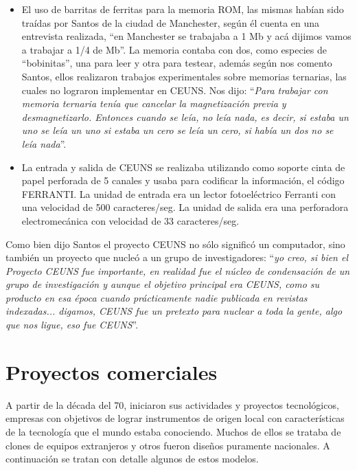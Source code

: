 \documentclass[%
 	final,
%
	notitlepage,
	narroweqnarray,
	inline,
 	twoside,
	]{ieee}
\begin{document}
\begin{itemize}
\item El uso de barritas de ferritas para la memoria ROM, las mismas hab\'ian sido tra\'idas por Santos de la ciudad de Manchester, seg\'un \'el cuenta en una entrevista realizada, ``en Manchester se trabajaba a 1 Mb y ac\'a dijimos vamos a trabajar a 1/4 de Mb''. La memoria contaba con dos, como especies de ``bobinitas'', una para leer y otra para testear, adem\'as seg\'un nos comento Santos, ellos realizaron trabajos experimentales sobre memorias ternarias, las cuales no lograron implementar en CEUNS. Nos dijo: ``\textit{Para trabajar con memoria ternaria ten\'ia que cancelar la magnetizaci\'on previa y desmagnetizarlo. Entonces cuando se le\'ia, no le\'ia nada, es decir, si estaba un uno se le\'ia un uno si estaba un cero se le\'ia un cero, si hab\'ia un dos no se le\'ia nada}''.
\item La entrada y salida de CEUNS se realizaba utilizando como soporte cinta de papel perforada de 5 canales y usaba para codificar la informaci\'on, el c\'odigo FERRANTI. La unidad de entrada era un lector fotoel\'ectrico Ferranti con una velocidad de 500 caracteres/seg. La unidad de salida era una perforadora electromec\'anica con velocidad de 33 caracteres/seg.
\end{itemize}

Como bien dijo Santos el proyecto CEUNS no s\'olo signific\'o un computador, sino tambi\'en un proyecto que nucle\'o a un grupo de investigadores:
``\textit{yo creo, si bien el Proyecto CEUNS fue importante, en realidad fue el n\'ucleo de condensaci\'on de un grupo de investigaci\'on y aunque el objetivo principal era CEUNS, como su producto en esa \'epoca cuando pr\'acticamente nadie publicada en revistas indexadas... digamos, CEUNS fue un pretexto para nuclear a toda la gente, algo que nos ligue, eso fue CEUNS}''.


\section{Proyectos comerciales}
A partir de la d\'ecada del 70, iniciaron sus actividades y proyectos tecnol\'ogicos, empresas con objetivos de lograr instrumentos de origen local con caracter\'isticas de la tecnolog\'ia que el mundo estaba conociendo. Muchos de ellos se trataba de clones de equipos extranjeros y otros fueron dise\~nos puramente nacionales.
A continuaci\'on se tratan con detalle algunos de estos modelos.
\end{document}
